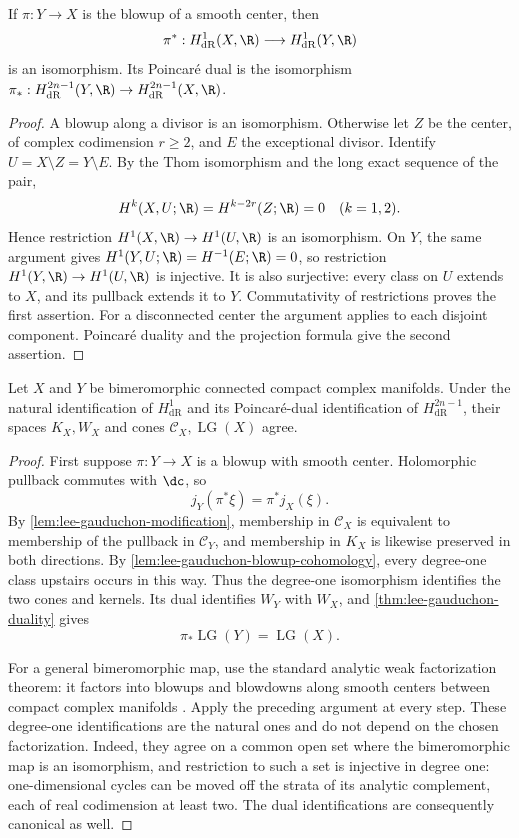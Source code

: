 \begin{lemma}\label{lem:lee-gauduchon-blowup-cohomology}
If $\pi:Y\to X$ is the blowup of a smooth center, then
\[
 \pi^*:H^1_{\mathrm{dR}}(X,\R)\longrightarrow
                    H^1_{\mathrm{dR}}(Y,\R)
\]
is an isomorphism. Its Poincar\'e dual is the isomorphism
$\pi_*:H^{2n-1}_{\mathrm{dR}}(Y,\R)\to H^{2n-1}_{\mathrm{dR}}(X,\R)$.
\end{lemma}
\begin{proof}
A blowup along a divisor is an isomorphism. Otherwise let $Z$ be the center, of complex codimension $r\geq2$, and $E$ the exceptional divisor. Identify
$U=X\setminus Z=Y\setminus E$. By the Thom isomorphism and the long exact sequence of the pair,
\[
 H^k(X,U;\R)=H^{k-2r}(Z;\R)=0\quad(k=1,2).
\]
Hence restriction $H^1(X,\R)\to H^1(U,\R)$ is an isomorphism. On $Y$, the same argument gives $H^1(Y,U;\R)=H^{-1}(E;\R)=0$, so restriction $H^1(Y,\R)\to H^1(U,\R)$ is injective. It is also surjective: every class on $U$ extends to $X$, and its pullback extends it to $Y$. Commutativity of restrictions proves the first assertion. For a disconnected center the argument applies to each disjoint component. Poincar\'e duality and the projection formula give the second assertion.
\end{proof}

\begin{theorem}\label{thm:lee-gauduchon-bimeromorphic}
Let $X$ and $Y$ be bimeromorphic connected compact complex manifolds. Under the natural identification of $H^1_{\mathrm{dR}}$ and its Poincar\'e-dual identification of $H^{2n-1}_{\mathrm{dR}}$, their spaces $K_X,W_X$ and cones $\mathcal C_X,\operatorname{LG}(X)$ agree.
\end{theorem}
\begin{proof}
First suppose $\pi:Y\to X$ is a blowup with smooth center. Holomorphic pullback commutes with $\dc$, so
\[
 j_Y(\pi^*\xi)=\pi^*j_X(\xi).
\]
By \cref{lem:lee-gauduchon-modification}, membership in $\mathcal C_X$ is equivalent to membership of the pullback in $\mathcal C_Y$, and membership in $K_X$ is likewise preserved in both directions. By \cref{lem:lee-gauduchon-blowup-cohomology}, every degree-one class upstairs occurs in this way. Thus the degree-one isomorphism identifies the two cones and kernels. Its dual identifies $W_Y$ with $W_X$, and \cref{thm:lee-gauduchon-duality} gives
\[
 \pi_*\operatorname{LG}(Y)=\operatorname{LG}(X).
\]

For a general bimeromorphic map, use the standard analytic weak factorization theorem: it factors into blowups and blowdowns along smooth centers between compact complex manifolds \cite[Theorem 0.3.1, analytic case]{AKMW02}. Apply the preceding argument at every step. These degree-one identifications are the natural ones and do not depend on the chosen factorization. Indeed, they agree on a common open set where the bimeromorphic map is an isomorphism, and restriction to such a set is injective in degree one: one-dimensional cycles can be moved off the strata of its analytic complement, each of real codimension at least two. The dual identifications are consequently canonical as well.
\end{proof}

